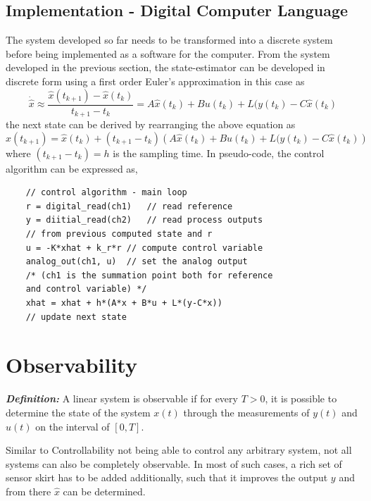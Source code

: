 \subsection{Implementation - Digital Computer Language}
The system developed so far needs to be transformed into a discrete system before being implemented as a software for the computer. From the system developed in the previous section, the state-estimator can be developed in discrete form using a first order Euler's approximation in this case as
\begin{equation}
	\dot{\hat{x}} \approx \frac{\hat{x}(t_{k+1}) - \hat{x}(t_{k})}{t_{k+1} -t_{k} } = A \hat{x}(t_{k}) + B u(t_{k}) + L(y(t_{k}) - C\hat{x}(t_{k})
\end{equation}
the next state can be derived by rearranging the above equation as
\begin{equation}
	\hat{x}(t_{k+1}) = \hat{x}(t_{k}) + ({t_{k+1} -t_{k} }) \left( A \hat{x}(t_{k}) + B u(t_{k}) + L(y(t_{k}) - C\hat{x}(t_{k}) \right)
\end{equation}
where $({t_{k+1} -t_{k} }) = h$ is the sampling time. In pseudo-code, the control algorithm can be expressed as,
\begin{lstlisting}
	// control algorithm - main loop
	r = digital_read(ch1)	// read reference
	y = diitial_read(ch2)	// read process outputs
	// from previous computed state and r
	u = -K*xhat + k_r*r	// compute control variable
	analog_out(ch1, u)	// set the analog output
	/* (ch1 is the summation point both for reference
	and control variable) */
	xhat = xhat + h*(A*x + B*u + L*(y-C*x))	
	// update next state
\end{lstlisting}

\section{Observability} \label{Sec_Observability}

\textbf{\textit{Definition: }} A linear system is observable if for every $T > 0$, it is possible to determine the state of the system $x(t)$ through the measurements of $y(t)$ and $u(t)$ on the interval of $[0,T]$.

Similar to Controllability not being able to control any arbitrary system, not all systems can also be completely observable. In most of such cases, a rich set of sensor skirt has to be added additionally, such that it improves the output $y$ and from there $\hat{x}$ can be determined.


